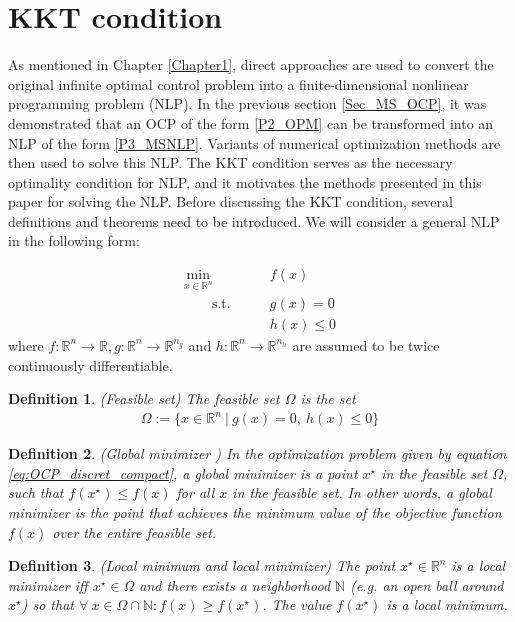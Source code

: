 \documentclass  [
  paper    = a4,
  BCOR     = 10mm,
  twoside,
  fontsize = 12pt,
  fleqn,
  toc      = bibnumbered,
  toc      = listofnumbered,
  numbers  = noendperiod,
  headings = normal,
  listof   = leveldown,
  version  = 3.03
]                                       {scrreprt}
\newcommand{\<}{\langle}
\renewcommand{\>}{\rangle}
\newtheorem{definition}{Definition}
\begin{document}
\section{KKT condition}
\label{Sec_KKT}
As mentioned in Chapter \ref{Chapter1}, direct approaches are used to convert the original infinite optimal control problem into a finite-dimensional nonlinear programming problem (NLP). In the previous section \ref{Sec_MS_OCP}, it was demonstrated that an OCP of the form \ref{P2_OPM} can be transformed into an NLP of the form \ref{P3_MSNLP}. Variants of numerical optimization methods are then used to solve this NLP. The KKT condition serves as the necessary optimality condition for NLP, and it motivates the methods presented in this paper for solving the NLP. Before discussing the KKT condition, several definitions and theorems need to be introduced. We will consider a general NLP in the following form:
 

\begin{equation}
	\label{eq:OCP_discret_compact}
	\begin{aligned}
		\underset{x \in \mathbb{R}^n}{\text{min}} \qquad &f(x)\\
		\qquad \text{s.t.}\qquad&  g(x) = 0   \\
		&  h(x)\leq 0 
	\end{aligned}
\end{equation}
where $f: \mathbb{R}^n \rightarrow \mathbb{R}, g: \mathbb{R}^n \rightarrow \mathbb{R}^{n_g}$ and $h: \mathbb{R}^n \rightarrow \mathbb{R}^{n_h}$ are assumed to be twice continuously differentiable.

\begin{definition}(Feasible set) The feasible set $\Omega$ is the set 
	\begin{align}
		\Omega:= \{x \in \mathbb{R}^n \ | \ g(x)= 0 , \ h(x)\leq 0 \}
	\end{align}
\end{definition}

\begin{definition}(Global minimizer ) In the optimization problem given by equation \ref{eq:OCP_discret_compact}, a global minimizer is a point $x^\star$ in the feasible set $\Omega$, such that $f(x^\star) \leq f(x)$ for all $x$ in the feasible set. In other words, a global minimizer is the point that achieves the minimum value of the objective function $f(x)$ over the entire feasible set.
\end{definition}

\begin{definition}(Local minimum and local minimizer) The point $x^\star \in \mathbb{R}^n$ is a local minimizer iff $x^\star \in  \Omega$ and there exists a neighborhood $\mathbb{N}$ (e.g. an open ball around $x^\star$) so that $ \forall \ x \in \Omega \cap \mathbb{N}: f(x) \geq f(x^\star)$. The value $f(x^\star)$ is a local minimum.
\end{definition}
\end{document}
